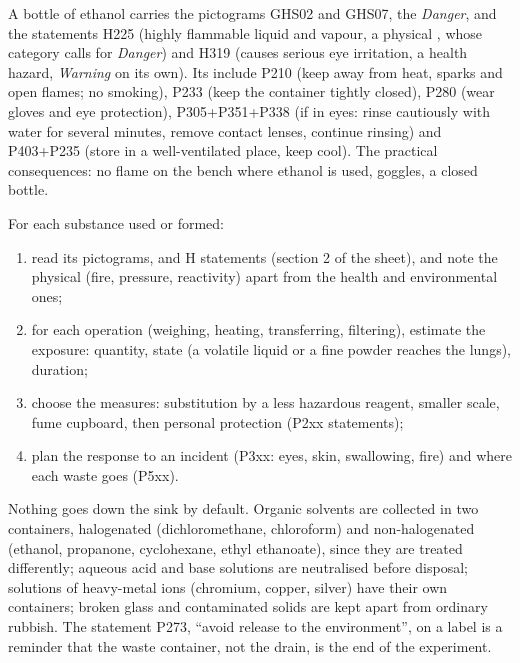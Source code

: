 \begin{example}
A bottle of ethanol carries the pictograms GHS02 and GHS07, the  \emph{Danger}, and the statements H225 (highly flammable liquid and
vapour, a physical , whose category calls for \emph{Danger}) and H319
(causes serious eye irritation, a health hazard, \emph{Warning} on its own).
Its  include P210 (keep away from heat, sparks and
open flames; no smoking), P233 (keep the container tightly closed), P280
(wear gloves and eye protection), P305+P351+P338 (if in eyes: rinse
cautiously with water for several minutes, remove contact lenses, continue
rinsing) and P403+P235 (store in a well-ventilated place, keep cool). The
practical consequences: no flame on the bench where ethanol is used,
goggles, a closed bottle.
\end{example}

\begin{method}\label{met:b1:lab-techniques-1:read-sds}
For each substance used or formed:
\begin{enumerate}
  \item read its pictograms,  and H statements (section 2 of
        the sheet), and note the physical  (fire, pressure,
        reactivity) apart from the health and environmental ones;
  \item for each operation (weighing, heating, transferring, filtering),
        estimate the exposure: quantity, state (a volatile liquid or a
        fine powder reaches the lungs), duration;
  \item choose the measures: substitution by a less hazardous reagent,
        smaller scale, fume cupboard, then personal protection (P2xx
        statements);
  \item plan the response to an incident (P3xx: eyes, skin, swallowing,
        fire) and where each waste goes (P5xx).
\end{enumerate}
\end{method}

\begin{inthelab}[Waste]
Nothing goes down the sink by default. Organic solvents are collected in
two containers, halogenated (dichloromethane, chloroform) and
non-halogenated (ethanol, propanone, cyclohexane, ethyl ethanoate), since
they are treated differently; aqueous acid and base solutions are
neutralised before disposal; solutions of heavy-metal ions (chromium,
copper, silver) have their own containers; broken glass and contaminated
solids are kept apart from ordinary rubbish. The statement P273, ``avoid
release to the environment'', on a label is a reminder that the waste
container, not the drain, is the end of the experiment.
\end{inthelab}

